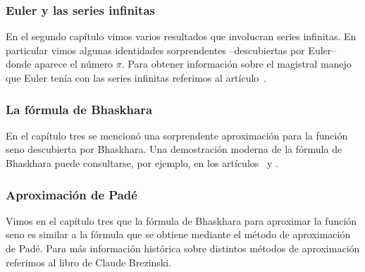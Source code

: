 \subsubsection*{Euler y las series infinitas}

En el segundo capítulo vimos varios resultados que involucran series infinitas. En particular 
vimos algunas identidades sorprendentes --descubiertas por Euler-- 
donde aparece el número $\pi$. Para obtener información 
sobre el magistral manejo que Euler tenía con las series
infinitas referimos al artículo~\cite{MR2338363}.

\subsubsection*{La fórmula de Bhaskhara}

En el capítulo tres se mencionó una sorprendente aproximación 
para la función seno descubierta por Bhaskhara. 
Una demostración moderna de la fórmula de Bhaskhara puede
consultarse, por ejemplo, en los artículos~\cite{MR1108101} y \cite{MR2793182}.

\subsubsection*{Aproximación de Pad\'e}

Vimos en el capítulo tres que la fórmula de Bhaskhara 
para aproximar la función seno es similar a la fórmula que
se obtiene mediante el método de aproximación de Pad\'e. Para
más información histórica sobre distintos m\'etodos 
de aproximación referimos al libro \cite{MR1083352} 
de Claude Brezinski. 